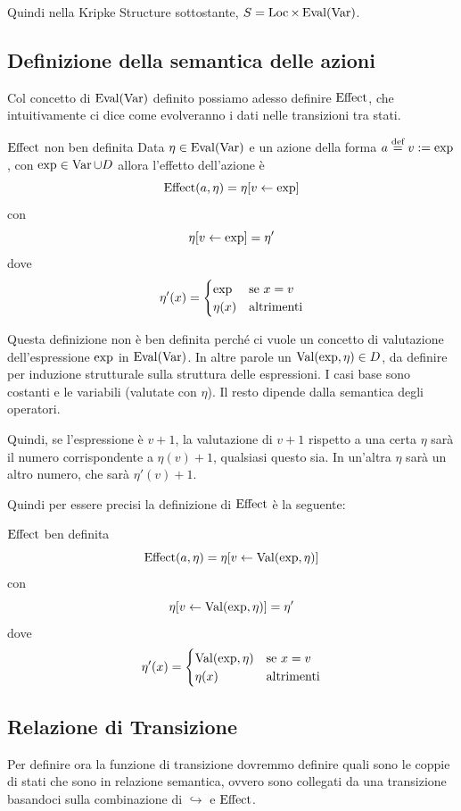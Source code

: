 Quindi nella Kripke Structure sottostante, \(S = \operatorname{Loc} \times \operatorname{Eval}(\operatorname{Var})\).

\subsection{Definizione della semantica delle azioni}
Col concetto di \(\operatorname{Eval}(\operatorname{Var})\) definito possiamo adesso definire \(\operatorname{Effect}\), che intuitivamente ci dice come evolveranno i dati nelle transizioni tra stati.

\begin{definition}{\(\operatorname{Effect}\) non ben definita}
  Data \(\eta \in \operatorname{Eval}(\operatorname{Var})\) e un azione della forma \(a \overset{\text{def}}{=} v := \operatorname{exp}\), con \(\operatorname{exp} \in \operatorname{Var} \cup D\) allora l'effetto dell'azione è
  \[\operatorname{Effect}(a,\eta)=\eta[v\leftarrow \operatorname{exp}]\] con
  \[\eta[v\leftarrow \operatorname{exp}] = \eta'\]
  dove
  \[\eta' (x)= \begin{cases}
      \operatorname{exp}   & \text{se } x = v  \\
      \eta(x) & \text{altrimenti}
    \end{cases}\]
\end{definition}


Questa definizione non è ben definita perché ci vuole un concetto di valutazione dell'espressione \(\operatorname{exp}\) in \(\operatorname{Eval}(\operatorname{Var})\). In altre parole un \(\operatorname{Val}(\operatorname{exp}, \eta) \in D\), da definire per induzione strutturale sulla struttura delle espressioni.
I casi base sono costanti e le variabili (valutate con \(\eta\)). Il resto dipende dalla semantica degli operatori.

Quindi, se l'espressione è \(v + 1\), la valutazione di \(v + 1\) rispetto a una certa \(\eta\) sarà il numero corrispondente a \(\eta(v) + 1\), qualsiasi questo sia. In un'altra \(\eta\) sarà un altro numero, che sarà \(\eta'(v) + 1\).

Quindi per essere precisi la definizione di \(\operatorname{Effect}\) è la seguente:
\begin{definition}{\(\operatorname{Effect}\) ben definita}
  \[\operatorname{Effect}(a,\eta)=\eta[v\leftarrow \operatorname{Val}(\operatorname{exp}, \eta)]\]
  con
  \[\eta[v\leftarrow \operatorname{Val}(\operatorname{exp},\eta)] = \eta'\]
  dove
  \[\eta' (x)= \begin{cases}
      \operatorname{Val}(\operatorname{exp},\eta) & \text{se } x = v  \\
      \eta(x)          & \text{altrimenti}
    \end{cases}\]
\end{definition}


\subsection{Relazione di Transizione}
Per definire ora la funzione di transizione dovremmo definire quali sono le coppie di stati che sono in relazione semantica, ovvero sono collegati da una transizione basandoci sulla combinazione di \(\hookrightarrow\) e \(\operatorname{Effect}\).

